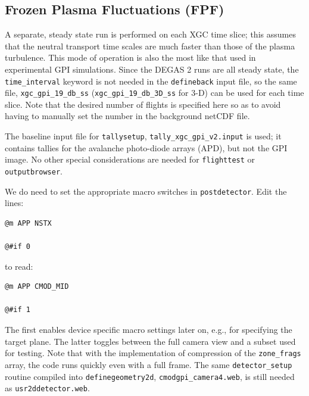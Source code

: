 \documentclass[12pt]{report}
\begin{document}
\subsection{Frozen Plasma Fluctuations (FPF)}

A separate, steady state run is performed on each XGC time slice;
this assumes that the neutral transport time scales are much
faster than those of the plasma turbulence.  This mode of
operation is also the most like that used in experimental
GPI simulations.  Since the DEGAS 2 runs are all
steady state, the {\tt time\_interval} keyword is not
needed in the {\tt defineback} input file, so the
same file, {\tt xgc\_gpi\_19\_db\_ss}
({\tt xgc\_gpi\_19\_db\_3D\_ss} for 3-D)
can be used for
each time slice.  Note that the desired number of flights
is specified here so as to avoid having to manually
set the number in the background netCDF file.

The baseline input file for {\tt tallysetup},
{\tt tally\_xgc\_gpi\_v2.input} is used; it
contains tallies for the avalanche photo-diode
arrays (APD), but not the GPI image.  No
other special considerations are needed for 
{\tt flighttest} or {\tt outputbrowser}.

We do need to set the appropriate macro switches
in {\tt postdetector}.  Edit the lines:
\begin{verbatim}
@m APP NSTX

@#if 0
\end{verbatim}
to read:
\begin{verbatim}
@m APP CMOD_MID

@#if 1
\end{verbatim}
The first enables device specific macro settings
later on, e.g., for specifying the target plane.
The latter toggles between the full camera view
and a subset used for testing.  Note that with the
implementation of compression of the {\tt zone\_frags}
array, the code runs quickly even with a full
frame.  The same {\tt detector\_setup} routine
compiled into {\tt definegeometry2d},
{\tt cmodgpi\_camera4.web}, is
still needed as {\tt usr2ddetector.web}.
\end{document}
